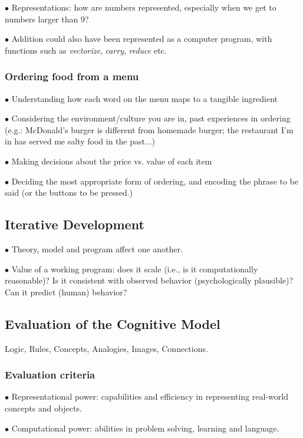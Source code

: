 \documentclass[english,openany]{book}
\begin{document}
$\bullet$ Representations: how are numbers represented, especially when we get to numbers larger than $9$?

$\bullet$ Addition could also have been represented as a computer program, with functions such as \textit{vectorize}, \textit{carry}, \textit{reduce} etc.

\subsubsection{Ordering food from a menu}

$\bullet$ Understanding how each word on the menu maps to a tangible ingredient

$\bullet$ Considering the environment/culture you are in, past experiences in ordering (e.g.: McDonald's burger is different from homemade burger; the restaurant I'm in has served me salty food in the past...)

$\bullet$ Making decisions about the price vs. value of each item

$\bullet$ Deciding the most appropriate form of ordering, and encoding the phrase to be said (or the buttons to be pressed.)

\subsection{Iterative Development}

$\bullet$ Theory, model and program affect one another.

$\bullet$ Value of a working program: does it scale (i.e., is it computationally reasonable)? Is it consistent with observed behavior (psychologically plausible)? Can it predict (human) behavior?

\subsection{Evaluation of the Cognitive Model}

Logic, Rules, Concepts, Analogies, Images, Connections.

\subsubsection{Evaluation criteria}

$\bullet$ Representational power: capabilities and efficiency in representing real-world concepts and objects.

$\bullet$ Computational power: abilities in problem solving, learning and language.
\end{document}
